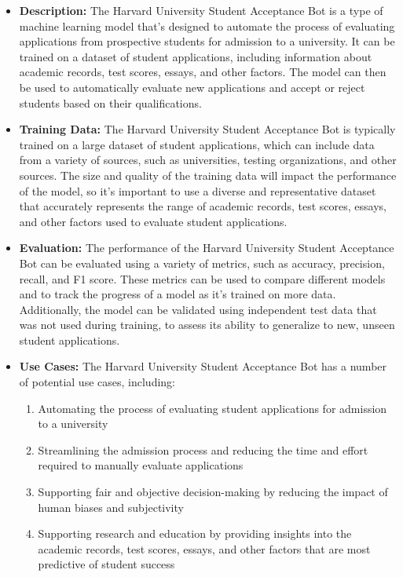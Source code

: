 \begin{itemize}
    \item \textbf{Description:} The Harvard University Student Acceptance Bot is a type of machine learning model that's designed to automate the process of evaluating applications from prospective students for admission to a university. It can be trained on a dataset of student applications, including information about academic records, test scores, essays, and other factors. The model can then be used to automatically evaluate new applications and accept or reject students based on their qualifications.
    \item \textbf{Training Data:} The Harvard University Student Acceptance Bot is typically trained on a large dataset of student applications, which can include data from a variety of sources, such as universities, testing organizations, and other sources. The size and quality of the training data will impact the performance of the model, so it's important to use a diverse and representative dataset that accurately represents the range of academic records, test scores, essays, and other factors used to evaluate student applications.
    \item \textbf{Evaluation:} The performance of the Harvard University Student Acceptance Bot can be evaluated using a variety of metrics, such as accuracy, precision, recall, and F1 score. These metrics can be used to compare different models and to track the progress of a model as it's trained on more data. Additionally, the model can be validated using independent test data that was not used during training, to assess its ability to generalize to new, unseen student applications.
    \item \textbf{Use Cases:} The Harvard University Student Acceptance Bot has a number of potential use cases, including:
        \begin{enumerate}  
            \item Automating the process of evaluating student applications for admission to a university
            \item Streamlining the admission process and reducing the time and effort required to manually evaluate applications
            \item Supporting fair and objective decision-making by reducing the impact of human biases and subjectivity
            \item Supporting research and education by providing insights into the academic records, test scores, essays, and other factors that are most predictive of student success

\end{enumerate}
\end{itemize}
